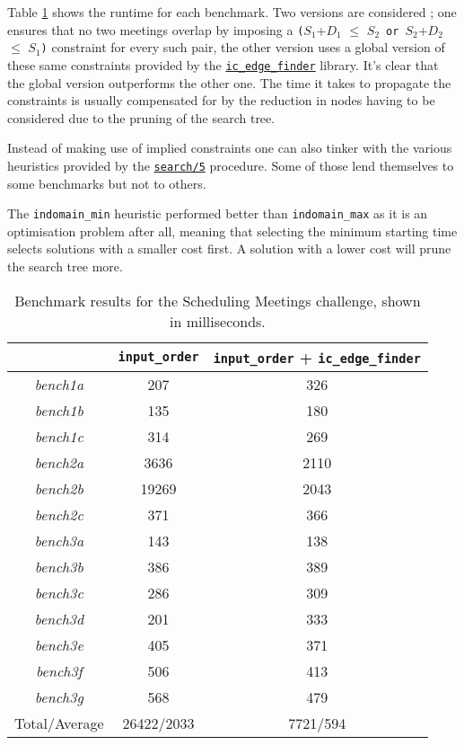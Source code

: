 Table \ref{tab:sche1} shows the runtime for each benchmark. Two versions are considered ; one ensures that no two meetings overlap by imposing a \texttt{(}$S_1$+$D_1$ $\leq$ $S_2$\ \texttt{or}\ $S_2$+$D_2$ $\leq$ $S_1$\texttt{)} constraint for every such pair, the other version uses a global version of these same constraints provided by the \href{http://eclipseclp.org/doc/bips/lib/ic_edge_finder/index.html}{\texttt{ic\_edge\_finder}} library. It's clear that the global version outperforms the other one. The time it takes to propagate the constraints is usually compensated for by the reduction in nodes having to be considered due to the pruning of the search tree.\\\par

Instead of making use of implied constraints one can also tinker with the various heuristics provided by the \href{http://eclipseclp.org/doc/bips/lib/ic/search-6.html}{\texttt{search/5}} procedure. Some of those lend themselves to some benchmarks but not to others.\par
The \texttt{indomain\_min} heuristic performed better than \texttt{indomain\_max} as it is an optimisation problem after all, meaning that selecting the minimum starting time selects solutions with a smaller cost first. A solution with a lower cost will prune the search tree more.

\begin{table}[H]
\centering
\bgroup
\def\arraystretch{1.3}
\begin{tabular}{ccc}
\multicolumn{1}{l}{} & \texttt{input\_order} & \texttt{input\_order} + \texttt{ic\_edge\_finder} \\ \hline
\textit{bench1a}  & 207 & 326 \\
\textit{bench1b}  & 135 & 180                                 \\
\textit{bench1c}  & 314   & 269                                 \\
\textit{bench2a}  & 3636   & 2110                                 \\
\textit{bench2b}  & 19269   & 2043                                 \\
\textit{bench2c}  & 371   & 366                                 \\
\textit{bench3a}  & 143   & 138                                 \\
\textit{bench3b}  & 386   & 389                                 \\
\textit{bench3c}  & 286   & 309                                 \\
\textit{bench3d}  & 201   & 333                                 \\
\textit{bench3e}  & 405   & 371                                 \\
\textit{bench3f}   & 506   & 413                                 \\
\textit{bench3g}  & 568   & 479                                 \\\hline
Total/Average     & 26422/2033   & 7721/594                       
\end{tabular}
\egroup
\caption{Benchmark results for the Scheduling Meetings challenge, shown in milliseconds.}
\label{tab:sche1}
\end{table}